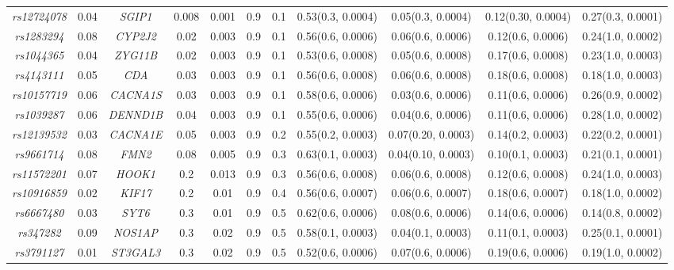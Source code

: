\documentclass[10pt]{article}
\begin{document}
\begin{landscape}
\begin{table}[!htbp]
{\begin{tabular}{c c| c|c c c c| c c c c}
\textit{rs12724078} & 0.04 & \textit{SGIP1} & 0.008 & 0.001 & 0.9 & 0.1 & 0.53(0.3, 0.0004) & 0.05(0.3, 0.0004) & 0.12(0.30, 0.0004) & 0.27(0.3, 0.0001) \\[2pt]
\textit{rs1283294} & 0.08 & \textit{CYP2J2} & 0.02 & 0.003 & 0.9 & 0.1 & 0.56(0.6, 0.0006) & 0.06(0.6, 0.0006) & 0.12(0.6, 0.0006) & 0.24(1.0, 0.0002) \\[2pt]
\textit{rs1044365} & 0.04 & \textit{ZYG11B} & 0.02 & 0.003 & 0.9 & 0.1 & 0.53(0.6, 0.0008) & 0.05(0.6, 0.0008) & 0.17(0.6, 0.0008) & 0.23(1.0, 0.0003) \\[2pt]
\textit{rs4143111} & 0.05 & \textit{CDA} & 0.03 & 0.003 & 0.9 & 0.1 & 0.56(0.6, 0.0008) & 0.06(0.6, 0.0008) & 0.18(0.6, 0.0008) & 0.18(1.0, 0.0003) \\[2pt]
\textit{rs10157719} & 0.06 & \textit{CACNA1S} & 0.03 & 0.003 & 0.9 & 0.1 & 0.58(0.6, 0.0006) & 0.03(0.6, 0.0006) & 0.11(0.6, 0.0006) & 0.26(0.9, 0.0002) \\[2pt]
\textit{rs1039287} & 0.06 & \textit{DENND1B} & 0.04 & 0.003 & 0.9 & 0.1 & 0.55(0.6, 0.0006) & 0.04(0.6, 0.0006) & 0.11(0.6, 0.0006) & 0.28(1.0, 0.0002) \\[2pt]
\textit{rs12139532} & 0.03 & \textit{CACNA1E} & 0.05 & 0.003 & 0.9 & 0.2 & 0.55(0.2, 0.0003) & 0.07(0.20, 0.0003) & 0.14(0.2, 0.0003) & 0.22(0.2, 0.0001) \\[2pt]
\textit{rs9661714} & 0.08 & \textit{FMN2} & 0.08 & 0.005 & 0.9 & 0.3 & 0.63(0.1, 0.0003) & 0.04(0.10, 0.0003) & 0.10(0.1, 0.0003) & 0.21(0.1, 0.0001) \\[2pt]
\textit{rs11572201} & 0.07 & \textit{HOOK1} & 0.2 & 0.013 & 0.9 & 0.3 & 0.56(0.6, 0.0008) & 0.06(0.6, 0.0008) & 0.12(0.6, 0.0008) & 0.24(1.0, 0.0003) \\[2pt]
\textit{rs10916859} & 0.02 &  \textit{KIF17} & 0.2 & 0.01 & 0.9 & 0.4 & 0.56(0.6, 0.0007) & 0.06(0.6, 0.0007) & 0.18(0.6, 0.0007) & 0.18(1.0, 0.0002) \\[2pt]
\textit{rs6667480} & 0.03 & \textit{SYT6} & 0.3 & 0.01 & 0.9 & 0.5 & 0.62(0.6, 0.0006) & 0.08(0.6, 0.0006) & 0.14(0.6, 0.0006) & 0.14(0.8, 0.0002) \\[2pt]
\textit{rs347282} & 0.09 & \textit{NOS1AP} & 0.3 & 0.02 & 0.9 & 0.5 & 0.58(0.1, 0.0003) & 0.04(0.1, 0.0003) & 0.11(0.1, 0.0003) & 0.25(0.1, 0.0001) \\[2pt]
\textit{rs3791127} & 0.01 & \textit{ST3GAL3} & 0.3 & 0.02 & 0.9 & 0.5 & 0.52(0.6, 0.0006) & 0.07(0.6, 0.0006) & 0.19(0.6, 0.0006) & 0.19(1.0, 0.0002) \\[1.5pt]\hline\hline
\end{tabular}}
\label{tab:mod}
\end{table}
\end{landscape}
\end{document}
